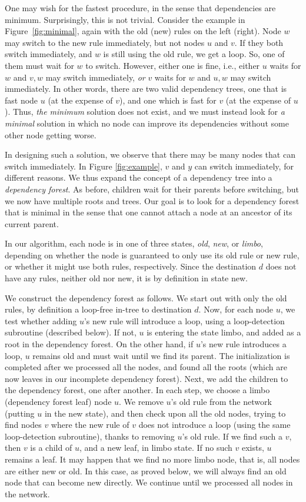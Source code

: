 One may wish for the fastest procedure, in the sense that dependencies are minimum. Surprisingly, this is not trivial. Consider the example in Figure~\ref{fig:minimal}, again with the old (new) rules on the left (right). Node $w$ may switch to the new rule immediately, but not nodes $u$ and $v$. If they both switch immediately, and $w$ is still using the old rule, we get a loop. So, one of them must wait for $w$ to switch. However, either one is fine, i.e., either $u$ waits for $w$ and $v,w$ may switch immediately, \emph{or} $v$ waits for $w$ and $u,w$ may switch immediately. In other words, there are two valid dependency trees, one that is fast node $u$ (at the expense of $v$), and one which is fast for $v$ (at the expense of $u$).
Thus, \emph{the minimum} solution does not exist, and we must instead look for \emph{a minimal} solution in which no node can improve its dependencies without some other node getting worse.

In designing such a solution, we observe that there may be many nodes that can switch immediately. In Figure \ref{fig:example}, $v$ and $y$ can switch immediately, for different reasons. We thus expand the concept of a dependency tree into a \emph{dependency forest}. As before, children wait for their parents before switching, but we now have multiple roots and trees. Our goal is to look for a dependency forest that is minimal in the sense that one cannot attach a node at an ancestor of its current parent.

In our algorithm, each node is in one of three states, \emph{old}, \emph{new}, or \emph{limbo}, depending on whether the node is guaranteed to only use its old rule or new rule, or whether it might use both rules, respectively. Since the destination $d$ does not have any rules, neither old nor new, it is by definition in state new.

We construct the dependency forest as follows. We start out with only the old rules, by definition a loop-free in-tree to destination $d$. Now, for each node $u$, we test whether adding $u$'s new rule will introduce a loop, using a loop-detection subroutine (described below). If not, $u$ is entering the state limbo, and added as a root in the dependency forest. On the other hand, if $u$'s new rule introduces a loop, $u$ remains old and must wait until we find its parent. The initialization is completed after we processed all the nodes, and found all the roots (which are now leaves in our incomplete dependency forest). Next, we add the children to the dependency forest, one after another. In each step, we choose a limbo (dependency forest leaf) node $u$. We remove $u$'s old rule from the network (putting $u$ in the new state), and then check upon all the old nodes, trying to find nodes $v$ where the new rule of $v$ does not introduce a loop (using the same loop-detection subroutine), thanks to removing $u$'s old rule. If we find such a $v$, then $v$ is a child of $u$, and a new leaf, in limbo state. If no such $v$ exists, $u$ remains a leaf. It may happen that we find no more limbo node, that is, all nodes are either new or old. In this case, as proved below, we will always find an old node that can become new directly.
We continue until we processed all nodes in the network.

